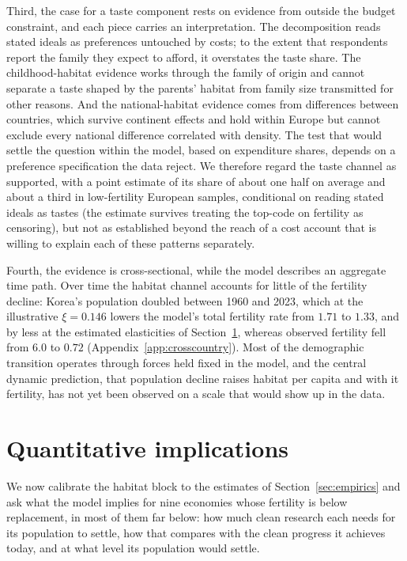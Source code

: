 \documentclass[11pt]{article}
\begin{document}
Third, the case for a taste component rests on evidence from outside the budget constraint, and
each piece carries an interpretation. The decomposition reads stated ideals as preferences
untouched by costs; to the extent that respondents report the family they expect to afford, it
overstates the taste share. The childhood-habitat evidence works through the family of origin and
cannot separate a taste shaped by the parents' habitat from family size transmitted for other
reasons. And the national-habitat evidence comes from differences between countries, which survive
continent effects and hold within Europe but cannot exclude every national difference correlated
with density. The test that would settle the question within the model, based
on expenditure shares, depends on a preference specification the data reject. We therefore regard
the taste channel as supported, with a point estimate of its share of about one half on average and about a third in low-fertility
European samples, conditional on reading stated ideals as tastes (the estimate survives treating the
top-code on fertility as censoring), but not as established beyond the
reach of a cost account that is willing to explain each of these patterns separately.

Fourth, the evidence is cross-sectional, while the model describes an aggregate time path. Over time
the habitat channel accounts for little of the fertility decline: Korea's population doubled between
1960 and 2023, which at the illustrative $\xi=0.146$ lowers the model's total fertility rate from $1.71$ to $1.33$, and by
less at the estimated elasticities of Section~\ref{sec:quant}, whereas
observed fertility fell from $6.0$ to $0.72$ (Appendix~\ref{app:crosscountry}). Most of the demographic
transition operates through forces held fixed in the model, and the central dynamic prediction, that
population decline raises habitat per capita and with it fertility, has not yet been observed on a
scale that would show up in the data.

\section{Quantitative implications}
\label{sec:quant}

We now calibrate the habitat block to the estimates of Section~\ref{sec:empirics} and ask what the
model implies for nine economies whose fertility is below replacement, in most of them far below: how much clean research each
needs for its population to settle, how that compares with the clean progress it achieves today, and at
what level its population would settle.
\end{document}
